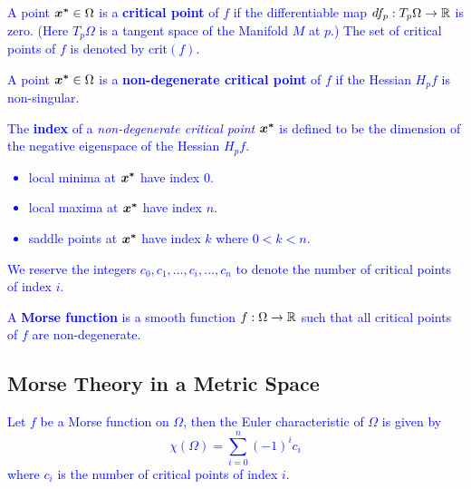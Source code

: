 \documentclass[10pt]{article}
\begin{document}
    \begin{definition}
        \textcolor{blue}{
            A point $\bm{x^*} \in \Omega$ is a \textbf{critical point} of $f$ if the
            differentiable map $df_p: T_p \Omega \rightarrow \mathbb{R}$ is zero. (Here
            $T_p \Omega$ is a tangent space of the Manifold $M$ at $p$.) 
            The set of critical points of $f$ is denoted by $\text{crit}(f)$.
        }
    \end{definition}

    \begin{definition}
        \textcolor{blue}{
            A point $\bm{x^*} \in \Omega$ is a \textbf{non-degenerate critical point} of $f$ if
            the Hessian $H_p f$ is non-singular.
        }
    \end{definition}

    \begin{definition}
        \textcolor{blue}{
            The \textbf{index} of a \emph{non-degenerate critical point} $\bm{x^*}$ is defined to be
            the dimension of the negative eigenspace of the Hessian $H_p f$.
            \begin{itemize}
                \item local minima at $\bm{x^*}$ have index $0$.
                \item local maxima at $\bm{x^*}$ have index $n$.
                \item saddle points at $\bm{x^*}$ have index $k$ where $0 < k < n$.
            \end{itemize}
            We reserve the integers $c_0, c_1, \dots, c_i, \dots, c_n$ to denote the number of
            critical points of index $i$.
        }
    \end{definition}

    \begin{definition}
        \textcolor{blue}{
            A \textbf{Morse function} is a smooth function $f : \Omega \rightarrow \mathbb{R}$ such that
            all critical points of $f$ are non-degenerate.
        }
    \end{definition}

    \subsection{Morse Theory in a Metric Space}

    \begin{theorem}
        \textcolor{Blue}{
            Let $f$ be a Morse function on $\Omega$, then the Euler characteristic of $\Omega$ is
            given by
            $$
                \chi(\Omega) = \sum_{i=0}^n (-1)^i c_i
            $$
            where $c_i$ is the number of critical points of index $i$.
        }
    \end{theorem}
\end{document}
